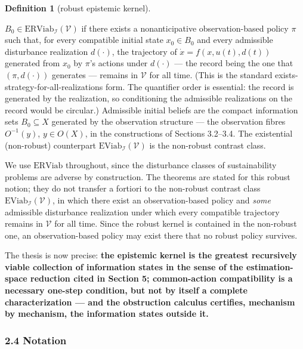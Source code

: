 \documentclass[10pt,twocolumn]{article}
\theoremstyle{definition}
\newtheorem{definition}{Definition}
\begin{document}
\begin{definition}[robust epistemic kernel]\label{def:kernel}

\(B_0 \in \mathrm{ERViab}_{\mathcal{I}}(\mathcal{V})\) if there exists a
nonanticipative observation-based policy \(\pi\) such that, for every
compatible initial state \(x_0 \in B_0\) and every admissible
disturbance realization \(d(\cdot)\), the trajectory of
\(\dot x = f(x, u(t), d(t))\) generated from \(x_0\) by \(\pi\)'s
actions under \(d(\cdot)\) --- the record being the one that
\((\pi, d(\cdot))\) generates --- remains in \(\mathcal{V}\) for all
time. (This is the standard exists-strategy-for-all-realizations form. The quantifier order is essential: the record is generated by the realization, so conditioning the admissible realizations on the record would be circular.) Admissible initial
beliefs are the compact information sets \(B_0 \subseteq X\) generated
by the observation structure --- the observation fibres \(O^{-1}(y)\),
\(y \in O(X)\), in the constructions of Sections 3.2--3.4. The existential (non-robust) counterpart \(\mathrm{EViab}_{\mathcal{I}}(\mathcal{V})\) is the non-robust contrast class.

\end{definition}

We use \(\mathrm{ERViab}\) throughout, since the disturbance classes of sustainability problems are adverse by construction. The theorems are stated for this robust notion; they do not transfer a fortiori to the non-robust contrast class \(\mathrm{EViab}_{\mathcal{I}}(\mathcal{V})\), in which there exist an observation-based policy and \emph{some} admissible disturbance realization under which every compatible trajectory remains in \(\mathcal{V}\) for all time. Since the robust kernel is contained in the non-robust one, an observation-based policy may exist there that no robust policy survives.

The thesis is now precise:
\textbf{the epistemic kernel is the greatest recursively viable collection of information states in the sense of the estimation-space reduction cited in Section 5; common-action compatibility is a necessary one-step condition, but not by itself a
complete characterization --- and the obstruction calculus certifies,
mechanism by mechanism, the information states outside it.}

\subsubsection{2.4 Notation}\label{notation}
\end{document}
